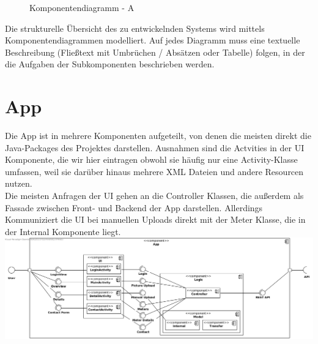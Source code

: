 \begin{figure}[h]
	\centering
	\caption{Komponentendiagramm - A}
	\label{fig:komponentendiagramm-a}
\end{figure}

\begin{tcolorbox}
Die strukturelle Übersicht des zu entwickelnden Systems wird mittels Komponentendiagrammen modelliert. 
Auf jedes Diagramm muss eine textuelle Beschreibung (Fließtext mit Umbrüchen / Absätzen oder Tabelle) folgen, in der die Aufgaben der Subkomponenten beschrieben werden. 
\end{tcolorbox}

\section{App}

Die App ist in mehrere Komponenten aufgeteilt, von denen die meisten direkt die Java-Packages des Projektes darstellen. Ausnahmen sind die Actvities in der UI Komponente, die wir hier eintragen obwohl sie häufig nur eine Activity-Klasse umfassen, weil sie darüber hinaus mehrere XML Dateien und andere Resourcen nutzen.\\
Die meisten Anfragen der UI gehen an die Controller Klassen, die außerdem als Fassade zwischen Front- und Backend der App darstellen. Allerdings Kommuniziert die UI bei manuellen Uploads direkt mit der Meter Klasse, die in der Internal Komponente liegt.\\ 

\includegraphics[scale=0.45]{img/diagrams/AppComponentDiagram} 